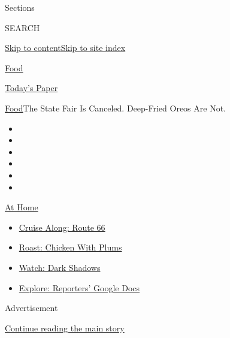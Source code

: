 Sections

SEARCH

\protect\hyperlink{site-content}{Skip to
content}\protect\hyperlink{site-index}{Skip to site index}

\href{https://www.nytimes3xbfgragh.onion/section/food}{Food}

\href{https://myaccount.nytimes3xbfgragh.onion/auth/login?response_type=cookie\&client_id=vi}{}

\href{https://www.nytimes3xbfgragh.onion/section/todayspaper}{Today's
Paper}

\href{/section/food}{Food}\textbar{}The State Fair Is Canceled.
Deep-Fried Oreos Are Not.

\begin{itemize}
\item
\item
\item
\item
\item
\item
\end{itemize}

\href{https://www.nytimes3xbfgragh.onion/spotlight/at-home?action=click\&pgtype=Article\&state=default\&region=TOP_BANNER\&context=at_home_menu}{At
Home}

\begin{itemize}
\tightlist
\item
  \href{https://www.nytimes3xbfgragh.onion/2020/09/07/travel/route-66.html?action=click\&pgtype=Article\&state=default\&region=TOP_BANNER\&context=at_home_menu}{Cruise
  Along: Route 66}
\item
  \href{https://www.nytimes3xbfgragh.onion/2020/09/04/dining/sheet-pan-chicken.html?action=click\&pgtype=Article\&state=default\&region=TOP_BANNER\&context=at_home_menu}{Roast:
  Chicken With Plums}
\item
  \href{https://www.nytimes3xbfgragh.onion/2020/09/04/arts/television/dark-shadows-stream.html?action=click\&pgtype=Article\&state=default\&region=TOP_BANNER\&context=at_home_menu}{Watch:
  Dark Shadows}
\item
  \href{https://www.nytimes3xbfgragh.onion/interactive/2020/at-home/even-more-reporters-editors-diaries-lists-recommendations.html?action=click\&pgtype=Article\&state=default\&region=TOP_BANNER\&context=at_home_menu}{Explore:
  Reporters' Google Docs}
\end{itemize}

Advertisement

\protect\hyperlink{after-top}{Continue reading the main story}

